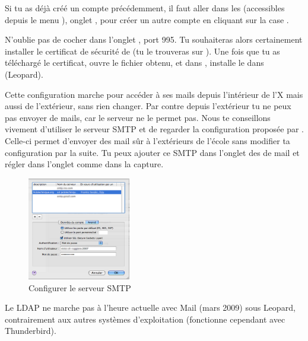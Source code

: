 Si tu as déjà créé un compte précédemment, il faut aller dans les  (accessibles depuis le menu ), onglet , pour créer un autre compte en cliquant sur la case \menu{+}.

N'oublie pas de cocher  dans l'onglet , port 995. Tu souhaiteras alors certainement installer le certificat de sécurité de  (tu le trouveras sur ). Une fois que tu as téléchargé le certificat, ouvre le fichier  obtenu, et dans , installe le dans %
 (Leopard).

Cette configuration marche pour accéder à ses mails depuis l'intérieur de l'X mais aussi de l'extérieur, sans rien changer. Par contre depuis l'extérieur tu ne peux pas envoyer de mails, car le serveur  ne le permet pas. Nous te conseillons vivement d'utiliser le serveur SMTP  et de regarder la configuration proposée par . Celle-ci permet d'envoyer des mail sûr à l'extérieurs de l'école sans modifier ta configuration par la suite. Tu peux ajouter ce SMTP dans l'onglet  des  de mail et régler dans l'onglet  comme dans la capture.

\begin{figure}[!hl]
    \begin{center}
	      \includegraphics[width=0.4\textwidth]{images/mac_config_smtp_poltechnique.png} 
      \caption{Configurer le serveur SMTP }
    \end{center}
  \end{figure}



Le LDAP ne marche pas à l'heure actuelle avec Mail (mars 2009) sous Leopard, contrairement aux  autres systèmes d'exploitation (fonctionne cependant avec Thunderbird).

